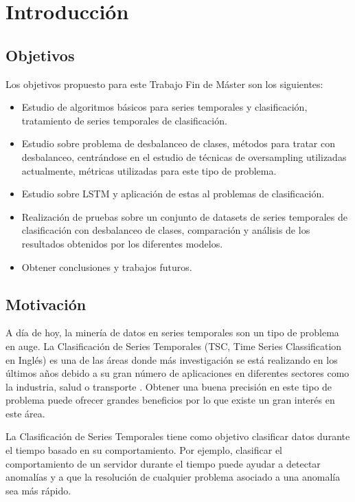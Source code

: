 \chapter{Introducción}
\section{Objetivos}
Los objetivos propuesto para este Trabajo Fin de Máster son los siguientes:

\begin{itemize}
	\item Estudio de algoritmos básicos para series temporales y clasificación, tratamiento de series temporales de clasificación.
	\item Estudio sobre problema de desbalanceo de clases, métodos para tratar con desbalanceo, centrándose en el estudio de técnicas de oversampling utilizadas actualmente, métricas utilizadas para este tipo de problema.
	\item Estudio sobre LSTM y aplicación de estas al problemas de clasificación.
	\item Realización de pruebas sobre un conjunto de datasets de series temporales de clasificación con desbalanceo de clases, comparación y análisis de los resultados obtenidos por los diferentes modelos.
	\item Obtener conclusiones y trabajos futuros.
\end{itemize}
\newpage
\section{Motivación}
A día de hoy, la minería de datos en series temporales son un tipo de problema en auge. La Clasificación de Series Temporales (TSC, Time Series Classification en Inglés) es una de las áreas donde más investigación se está realizando en los últimos años debido a su gran número de aplicaciones en diferentes sectores como la industria, salud o transporte \cite{cao2013integrated} \cite{cao2014parsimonious} \cite{he2017uncertainty} \cite{xu2018spatio} \cite{roychoudhury2017cost} \cite{liang2013effective} \cite{geng2018cost} . Obtener una buena precisión en este tipo de problema puede ofrecer grandes beneficios por lo que existe un gran interés en este área.\newline

La Clasificación de Series Temporales tiene como objetivo clasificar datos durante el tiempo basado en su comportamiento. Por ejemplo, clasificar el comportamiento de un servidor durante el tiempo puede ayudar a detectar anomalías y a que la resolución de cualquier problema asociado a una anomalía sea más rápido.\newline

